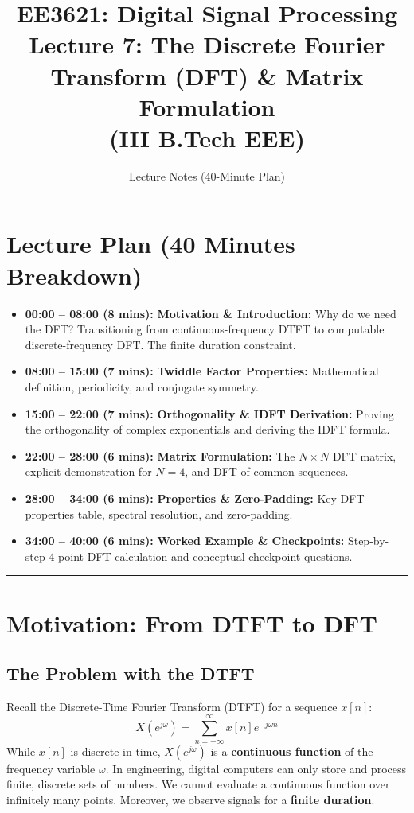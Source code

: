 \documentclass[11pt,a4paper]{article}
\title{\textbf{EE3621: Digital Signal Processing} \\ \Large Lecture 7: The Discrete Fourier Transform (DFT) \& Matrix Formulation \\ \large (III B.Tech EEE)}
\author{Lecture Notes (40-Minute Plan)}
\date{}
\begin{document}
\maketitle

\section{Lecture Plan (40 Minutes Breakdown)}
\begin{itemize}
    \item \textbf{00:00 -- 08:00 (8 mins):} \textbf{Motivation \& Introduction:} Why do we need the DFT? Transitioning from continuous-frequency DTFT to computable discrete-frequency DFT. The finite duration constraint.
    \item \textbf{08:00 -- 15:00 (7 mins):} \textbf{Twiddle Factor Properties:} Mathematical definition, periodicity, and conjugate symmetry.
    \item \textbf{15:00 -- 22:00 (7 mins):} \textbf{Orthogonality \& IDFT Derivation:} Proving the orthogonality of complex exponentials and deriving the IDFT formula.
    \item \textbf{22:00 -- 28:00 (6 mins):} \textbf{Matrix Formulation:} The $N \times N$ DFT matrix, explicit demonstration for $N=4$, and DFT of common sequences.
    \item \textbf{28:00 -- 34:00 (6 mins):} \textbf{Properties \& Zero-Padding:} Key DFT properties table, spectral resolution, and zero-padding.
    \item \textbf{34:00 -- 40:00 (6 mins):} \textbf{Worked Example \& Checkpoints:} Step-by-step 4-point DFT calculation and conceptual checkpoint questions.
\end{itemize}

\noindent\rule{\textwidth}{0.5pt}

\section{Motivation: From DTFT to DFT}
\subsection{The Problem with the DTFT}
Recall the Discrete-Time Fourier Transform (DTFT) for a sequence $x[n]$:
\begin{equation}
X(e^{j\omega}) = \sum_{n=-\infty}^{\infty} x[n] e^{-j\omega n}
\end{equation}
While $x[n]$ is discrete in time, $X(e^{j\omega})$ is a \textbf{continuous function} of the frequency variable $\omega$. In engineering, digital computers can only store and process finite, discrete sets of numbers. We cannot evaluate a continuous function over infinitely many points. Moreover, we observe signals for a \textbf{finite duration}.
\end{document}
